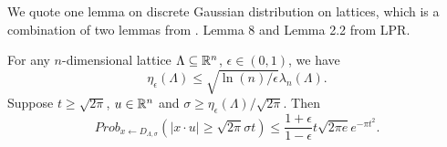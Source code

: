 \documentclass[envcountsame]{llncs}
\begin{document}







\iffalse
We quote one lemma on discrete Gaussian distribution on lattices, which is a combination of two lemmas from \cite{langlois2014worst}. Lemma 8 and Lemma 2.2  from LPR.
\begin{lemma}
\label{lem: last}
For any $n$-dimensional lattice $\Lambda \subseteq \mathbb{R}^n$, $\epsilon \in (0,1)$, we have
$$\eta_\epsilon(\Lambda) \leq \sqrt{\ln(n)/\epsilon} \lambda_n(\Lambda).$$
Suppose $t \geq \sqrt{2 \pi}$, $u \in \mathbb{R}^n$ and $\sigma \geq \eta_\epsilon(\Lambda)/\sqrt{2 \pi}$. Then
\[
    Prob_{x \gets D_{\Lambda,\sigma}}(|x \cdot u| \geq \sqrt{2 \pi}\sigma t) \leq \frac{1+\epsilon}{1-\epsilon} t \sqrt{2 \pi e} e^{- \pi t^2}.
\]
\end{lemma}
\end{document}
